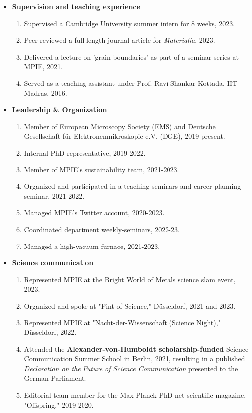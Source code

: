 \begin{itemize}
    \item[] \textbf{Supervision and teaching experience}
    \begin{enumerate}
        \item Supervised a Cambridge University summer intern for 8 weeks, 2023.
        \item Peer-reviewed a full-length journal article for \emph{Materialia}, 2023.
        \item Delivered a lecture on 'grain boundaries' as part of a seminar series at MPIE, 2021.
        \item Served as a teaching assistant under Prof. Ravi Shankar Kottada, IIT - Madras, 2016.
    \end{enumerate}    
    \item[] \textbf{Leadership \& Organization}
    \begin{enumerate}
        \item Member of European Microscopy Society (EMS) and Deutsche Gesellschaft für Elektronenmikroskopie e.V. (DGE), 2019-present.
        \item Internal PhD representative, 2019-2022.
        \item Member of MPIE's sustainability team, 2021-2023.
        \item Organized and participated in a teaching seminars and career planning seminar, 2021-2022.
        \item Managed MPIE's Twitter account, 2020-2023.
        \item Coordinated department weekly-seminars, 2022-23.
        \item Managed a high-vacuum furnace, 2021-2023.
    \end{enumerate}
    \item[] \textbf{Science communication}
    \begin{enumerate}
        \item Represented MPIE at the Bright World of Metals science slam event, 2023.
        \item Organized and spoke at "Pint of Science," Düsseldorf, 2021 and 2023.
        \item Represented MPIE at "Nacht-der-Wissenschaft (Science Night)," Düsseldorf, 2022.
        \item Attended the \textbf{Alexander-von-Humboldt scholarship-funded} Science Communication Summer School in Berlin, 2021, resulting in a published \textit{Declaration on the Future of Science Communication} presented to the German Parliament.
        \item Editorial team member for the Max-Planck PhD-net scientific magazine, "Offspring," 2019-2020.
    \end{enumerate}
\end{itemize}
